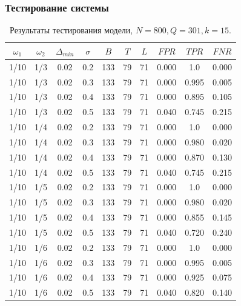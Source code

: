 \documentclass[pdf, 9pt,intlimits, unicode]{beamer}
\begin{document}
	\begin{frame}
		\frametitle{Тестирование системы}
		\begin{table}[!hhh]
			\center
			\caption{Результаты тестирования модели, $ N = 800, Q=301, k=15 $.}
			\begin{tabular}{cccccccccc}
				\toprule
				$ \omega_1 $ & $ \omega_2 $ & $ \Delta_{min} $ & $ \sigma $ &    $ B $ &   $ T $ &   $ L $ &    $ FPR $ &    $ TPR $ &    $ FNR $ \\
				\midrule
				1/10 &     1/3 &        0.02 &     0.2 & 133 & 79 & 71 & 0.000 & 1.0 & 0.000 \\
				1/10 &     1/3 &        0.02 &     0.3 & 133 & 79 & 71 & 0.000 & 0.995 & 0.005 \\
				1/10 &     1/3 &        0.02 &     0.4 & 133 & 79 & 71 & 0.000 & 0.895 & 0.105 \\
				1/10 &     1/3 &        0.02 &     0.5 & 133 & 79 & 71 & 0.040 & 0.745 & 0.215 \\
				\hline
				1/10 &     1/4 &        0.02 &     0.2 & 133 & 79 & 71 & 0.000 & 1.0 & 0.000 \\
				1/10 &     1/4 &        0.02 &     0.3 & 133 & 79 & 71 & 0.000 & 0.980 & 0.020 \\
				1/10 &     1/4 &        0.02 &     0.4 & 133 & 79 & 71 & 0.000 & 0.870 & 0.130 \\
				1/10 &     1/4 &        0.02 &     0.5 & 133 & 79 & 71 & 0.040 & 0.745 & 0.215 \\
				\hline
				1/10 &     1/5 &        0.02 &     0.2 & 133 & 79 & 71 & 0.000 & 1.0 & 0.000 \\
				1/10 &     1/5 &        0.02 &     0.3 & 133 & 79 & 71 & 0.000 & 0.980 & 0.020 \\
				1/10 &     1/5 &        0.02 &     0.4 & 133 & 79 & 71 & 0.000 & 0.855 & 0.145 \\
				1/10 &     1/5 &        0.02 &     0.5 & 133 & 79 & 71 & 0.040 & 0.720 & 0.240 \\
				\hline
				1/10 &     1/6 &        0.02 &     0.2 & 133 & 79 & 71 & 0.000 & 1.0 & 0.000 \\
				1/10 &     1/6 &        0.02 &     0.3 & 133 & 79 & 71 & 0.000 & 0.995 & 0.005 \\
				1/10 &     1/6 &        0.02 &     0.4 & 133 & 79 & 71 & 0.000 & 0.925 & 0.075 \\
				1/10 &     1/6 &        0.02 &     0.5 & 133 & 79 & 71 & 0.040 & 0.820 & 0.140 \\
				\bottomrule
			\end{tabular}
			\label{tab:simplified_system_results_k=15_1}
		\end{table}
	\end{frame}	
	
\end{document}
